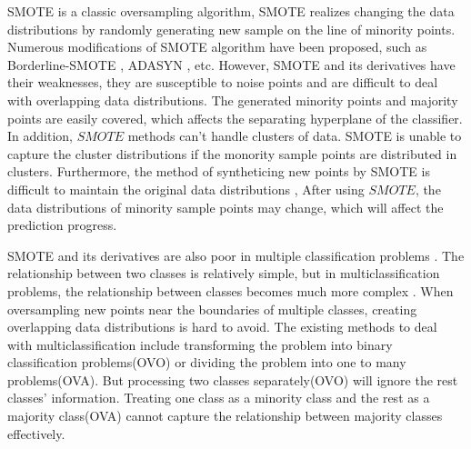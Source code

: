 \documentclass[ida]{iosart2x}
\begin{document}
SMOTE is a classic oversampling algorithm,
SMOTE realizes changing the data distributions by randomly generating new sample 
on the line of minority points.
Numerous modifications of SMOTE algorithm have been proposed, such as
Borderline-SMOTE \cite{2005Borderline}, ADASYN \cite{2008ADASYN}, etc. 
However, SMOTE and its derivatives have their weaknesses,
they are susceptible to noise points and are difficult to deal with
 overlapping data distributions.
The generated minority points and majority points are easily covered, 
which affects the separating hyperplane of the classifier. 
In addition, $SMOTE$ methods can't handle
clusters of data. SMOTE is unable to capture the cluster distributions
if the monority sample points are distributed in clusters.
Furthermore,
the method of syntheticing new points by SMOTE is difficult to 
maintain the original data distributions \cite{2008DATA},
After using $SMOTE$, 
the data distributions of minority sample points may change,
which will affect the prediction progress.


 SMOTE and its derivatives are also poor in multiple classification problems \cite{2020Combined}. 
 The relationship between two classes is relatively simple,
but in multiclassification problems, the relationship 
between classes becomes much more complex \cite{2017Relevance}.
When oversampling new points near the boundaries of multiple classes, 
creating overlapping data distributions \cite{Jierui2013Overlapping} is hard to avoid.
The existing methods to deal with multiclassification include transforming 
the problem into binary classification problems(OVO) \cite{articlemulti} or 
dividing the problem into one to many problems(OVA).
But processing two classes separately(OVO) will ignore the rest classes' information.
Treating one class as a minority class and the rest as a majority class(OVA)
cannot capture the relationship between majority classes effectively.
\end{document}
